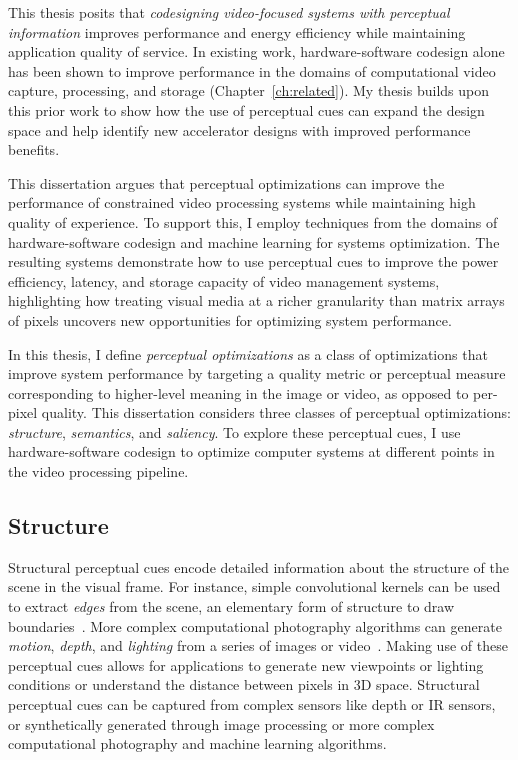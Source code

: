 This thesis posits that \emph{codesigning video-focused systems with perceptual information} improves performance and energy efficiency while maintaining application quality of service.
In existing work, hardware-software codesign alone has been shown to improve performance in the domains of computational video capture, processing, and storage (Chapter~\ref{ch:related}).
My thesis builds upon this prior work to show how the use of perceptual cues can expand the design space and help identify new accelerator designs with improved performance benefits.

This dissertation argues that perceptual optimizations can improve the performance of constrained video processing systems while maintaining high quality of experience.
To support this, I employ techniques from the domains of hardware-software codesign and machine learning for systems optimization.
The resulting systems demonstrate how to use perceptual cues to improve the power efficiency, latency, and storage capacity of video management systems, highlighting how treating visual media at a richer granularity than matrix arrays of pixels uncovers new opportunities for optimizing system performance.

In this thesis, I define \textit{perceptual optimizations} as a class of optimizations that improve system performance by targeting a quality metric or perceptual measure corresponding to higher-level meaning in the image or video, as opposed to per-pixel quality.
This dissertation considers three classes of perceptual optimizations: \textit{structure}, \textit{semantics}, and \textit{saliency}. To explore these perceptual cues, I use hardware-software codesign to optimize computer systems at different points in the video processing pipeline.

\subsection{Structure}
Structural perceptual cues encode detailed information about the structure of the  scene in the visual frame.
For instance, simple convolutional kernels can be used to extract \emph{edges} from the scene, an elementary form of structure to draw boundaries~\cite{FFLS2008}.
More complex computational photography algorithms can generate \emph{motion}, \emph{depth}, and \emph{lighting} from a series of images or video~\cite{optical-flow, googlejump, Barron2015A}.
Making use of these perceptual cues allows for applications to generate new viewpoints or lighting conditions or understand the distance between pixels in 3D space.
Structural perceptual cues can be captured from complex sensors like depth or IR sensors, or synthetically generated through image processing or more complex computational photography and machine learning algorithms.

